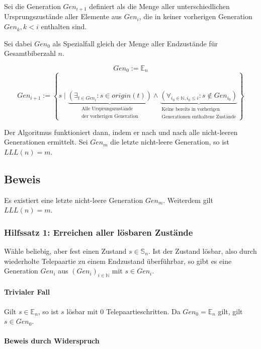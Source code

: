 \documentclass[a4paper,10pt,ngerman]{scrartcl}
\begin{document}
Sei die Generation \(Gen_{i+1}\) definiert als die Menge aller unterschiedlichen Ursprungszustände aller Elemente aus \(Gen_i\), die in keiner vorherigen Generation \(Gen_k, k < i\) enthalten sind.

Sei dabei \(Gen_0\) als Spezialfall gleich der Menge aller Endzustände für Gesamtbiberzahl \(n\).

\[Gen_0 := \mathbb{E}_n\]
\[Gen_{i+1} := \left\{ s \mid \underbrace{\left(\exists_{t \in Gen_i} : s \in origin(t)\right)}_{\substack{\text{Alle Ursprungszustände}\\\text{der vorherigen Generation}}} \land \underbrace{\left(\forall_{i_0\in\mathbb{N}, i_0 \leq i}: s \notin Gen_{i_0}\right)}_{\substack{\text{Keine bereits in vorherigen}\\\text{Generationen enthaltene Zustände}}} \right\}\]

Der Algoritmus funktioniert dann, indem er nach und nach alle nicht-leeren Generationen ermittelt. Sei \(Gen_m\) die letzte nicht-leere Generation, so ist \(LLL(n) = m\).

\subsection{Beweis}

Es existiert eine letzte nicht-leere Generation \(Gen_m\).
Weiterdem gilt \(LLL(n) = m\).

\subsubsection{Hilfssatz 1: Erreichen aller lösbaren Zustände} \label{proof:completeness}

Wähle beliebig, aber fest einen Zustand \(s\in\mathbb{S}_n\).
Ist der Zustand lösbar, also durch wiederholte Telepaartie zu einem Endzustand überführbar, so gibt es eine Generation \(Gen_i\) aus \((Gen_i)_{i\in\mathbb{N}}\) mit \(s\in Gen_i\).

\paragraph{Trivialer Fall}
Gilt \(s\in\mathbb{E}_n\), so ist \(s\) lösbar mit 0 Telepaartieschritten. Da \(Gen_0 = \mathbb{E}_n\) gilt, gilt \(s \in Gen_0\).

\paragraph{Beweis durch Widerspruch}
\end{document}
